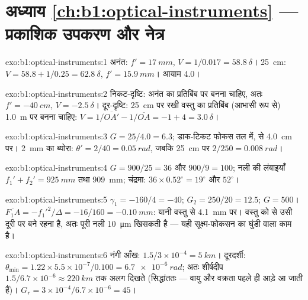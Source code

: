 \section*{अध्याय \ref{ch:b1:optical-instruments} --- प्रकाशिक उपकरण और नेत्र}

\begin{solution}{exo:b1:optical-instruments:1}
अनंत: $f' = \qty{17}{mm}$, $V = 1/0.017 = \qty{58.8}{\delta}$।
\qty{25}{cm}: $V = 58.8 + 1/0.25 = \qty{62.8}{\delta}$, $f' = \qty{15.9}{mm}$।
आयाम \qty{4.0}{\delta}।
\end{solution}

\begin{solution}{exo:b1:optical-instruments:2}
निकट-दृष्टि: अनंत का प्रतिबिंब  पर बनना चाहिए, अतः $f' = \qty{-40}{cm}$,
$V = \qty{-2.5}{\delta}$। दूर-दृष्टि: \qty{25}{cm} पर रखी वस्तु का प्रतिबिंब
(आभासी रूप से) \qty{1.0}{m} पर बनना चाहिए: $V = 1/\overline{OA'} - 1/\overline{OA}
= -1 + 4 = \qty{+3.0}{\delta}$।
\end{solution}

\begin{solution}{exo:b1:optical-instruments:3}
$G = 25/4.0 = 6.3$; डाक-टिकट फोकस तल में,  से \qty{4.0}{cm} पर।
\qty{2}{mm} का ब्योरा: $\theta' = 2/40 = \qty{0.05}{rad}$, जबकि \qty{25}{cm}
पर $2/250 = \qty{0.008}{rad}$।
\end{solution}

\begin{solution}{exo:b1:optical-instruments:4}
$G = 900/25 = 36$ और $900/9 = 100$; नली की लंबाइयाँ $f_1' + f_2' =
\qty{925}{mm}$ तथा \qty{909}{mm}; चंद्रमा: $36 \times 0.52^\circ = 19^\circ$
और $52^\circ$।
\end{solution}

\begin{solution}{exo:b1:optical-instruments:5}
$\gamma_1 = -160/4 = -40$; $G_2 = 250/20 = 12.5$; $G = 500$।
$\overline{F_1A} = -f_1'^2/\Delta = -16/160 = \qty{-0.10}{mm}$: यानी वस्तु
 से \qty{4.1}{mm} पर। वस्तु को  से उसी दूरी पर बने रहना है,
अतः पूरी नली \qty{10}{\micro m} खिसकती है --- यही सूक्ष्म-फोकसन का घुंडी वाला
काम है।
\end{solution}

\begin{solution}{exo:b1:optical-instruments:6}
नंगी आँख: $1.5/3\times10^{-4} = \qty{5}{km}$। दूरदर्शी: $\theta_{\min}
= 1.22 \times 5.5\times10^{-7}/0.100 = \qty{6.7e-6}{rad}$; अतः शीर्षदीप
$1.5/6.7\times10^{-6} \approx \qty{220}{km}$ तक अलग दिखते (सिद्धांततः ---
वायु और वक्रता पहले ही आड़े आ जाती हैं)। $G_r = 3\times10^{-4}/
6.7\times10^{-6} = 45$।
\end{solution}

